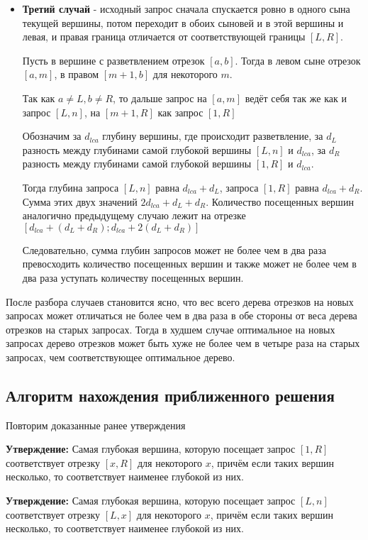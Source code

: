 \begin{itemize}
    
    \item \textbf{Третий случай} - исходный запрос сначала спускается ровно в одного сына текущей вершины, потом
    переходит в обоих сыновей и в этой вершины и левая, и правая граница отличается от соответствующей границы $[L, R]$.
    
    Пусть в вершине с разветвлением отрезок $[a, b]$. Тогда в левом сыне отрезок $[a, m]$, в правом $[m + 1, b]$ для некоторого $m$.
    
    Так как $a \ne L, b \ne R$, то дальше запрос на $[a, m]$ ведёт себя так же как и запрос $[L, n]$, на $[m + 1, R]$ как запрос $[1, R]$
    
    Обозначим за $d_{lca}$ глубину вершины, где происходит разветвление, за $d_L$ разность между глубинами самой глубокой вершины $[L, n]$ и $d_{lca}$, за $d_R$ разность между глубинами самой глубокой вершины $[1, R]$ и $d_{lca}$.
    
    Тогда глубина запроса $[L, n]$ равна $d_{lca} + d_L$, запроса $[1, R]$ равна $d_{lca} + d_R$. Сумма этих двух значений $2d_{lca} + d_L + d_R$.
    Количество посещенных вершин аналогично предыдущему случаю лежит на отрезке $[d_{lca} + (d_L + d_R); d_{lca} + 2(d_L + d_R)]$
    
    Следовательно, сумма глубин запросов может не более чем в два раза превосходить количество посещенных вершин и также может не более чем в два раза уступать количеству посещенных вершин.

\end{itemize}    

После разбора случаев становится ясно, что вес всего дерева отрезков на новых запросах может отличаться не более чем в два раза в обе стороны от веса дерева отрезков на старых запросах. Тогда в худшем случае оптимальное на новых запросах дерево отрезков может быть хуже не более чем в четыре раза на старых запросах, чем соответствующее оптимальное дерево.


\subsection{Алгоритм нахождения приближенного решения}

Повторим доказанные ранее утверждения

\textbf{Утверждение:} Самая глубокая вершина, которую посещает запрос $[1, R]$ соответствует отрезку $[x, R]$ для некоторого $x$, причём если таких вершин несколько, то соответствует наименее глубокой из них.

\textbf{Утверждение:} Самая глубокая вершина, которую посещает запрос $[L, n]$ соответствует отрезку $[L, x]$ для некоторого $x$, причём если таких вершин несколько, то соответствует наименее глубокой из них.

